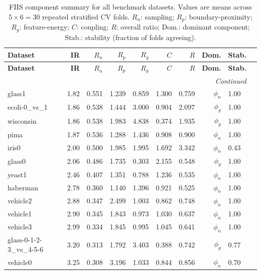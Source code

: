 \begin{longtable}{lrrrrrrrll}
\caption{FIIS component summary for all benchmark datasets. Values are means across $5\times6=30$ repeated stratified CV folds. $R_n$: sampling; $R_p$: boundary-proximity; $R_g$: feature-energy; $C$: coupling; $R$: overall ratio; Dom.: dominant component; Stab.: stability (fraction of folds agreeing).}
\label{tab:fiis_components} \\
\toprule
\textbf{Dataset} & \textbf{IR} & \textbf{$R_n$} & \textbf{$R_p$} & \textbf{$R_g$} & \textbf{$C$} & \textbf{$R$} & \textbf{Dom.} & \textbf{Stab.} \\
\midrule
\endfirsthead
\toprule
\textbf{Dataset} & \textbf{IR} & \textbf{$R_n$} & \textbf{$R_p$} & \textbf{$R_g$} & \textbf{$C$} & \textbf{$R$} & \textbf{Dom.} & \textbf{Stab.} \\
\midrule
\endhead
\midrule \multicolumn{9}{r}{\textit{Continued}} \\
\endfoot
\bottomrule
\endlastfoot
    glass1 & 1.82 & 0.551 & 1.239 & 0.859 & 1.300 & 0.759 & $\phi_{n}$ & 1.00 \\
    ecoli-0\_vs\_1 & 1.86 & 0.538 & 1.444 & 3.000 & 0.904 & 2.097 & $\phi_{g}$ & 1.00 \\
    wisconsin & 1.86 & 0.538 & 1.983 & 4.838 & 0.374 & 1.935 & $\phi_{g}$ & 1.00 \\
    pima & 1.87 & 0.536 & 1.288 & 1.436 & 0.908 & 0.900 & $\phi_{n}$ & 1.00 \\
    iris0 & 2.00 & 0.500 & 1.985 & 1.995 & 1.692 & 3.342 & $\phi_{n}$ & 0.43 \\
    glass0 & 2.06 & 0.486 & 1.735 & 0.303 & 2.155 & 0.548 & $\phi_{g}$ & 1.00 \\
    yeast1 & 2.46 & 0.407 & 1.351 & 0.788 & 1.236 & 0.535 & $\phi_{n}$ & 1.00 \\
    haberman & 2.78 & 0.360 & 1.140 & 1.396 & 0.921 & 0.525 & $\phi_{n}$ & 1.00 \\
    vehicle2 & 2.88 & 0.347 & 2.499 & 1.003 & 0.862 & 0.748 & $\phi_{n}$ & 1.00 \\
    vehicle1 & 2.90 & 0.345 & 1.843 & 0.973 & 1.030 & 0.637 & $\phi_{n}$ & 1.00 \\
    vehicle3 & 2.99 & 0.334 & 1.845 & 0.995 & 1.045 & 0.641 & $\phi_{n}$ & 1.00 \\
    glass-0-1-2-3\_vs\_4-5-6 & 3.20 & 0.313 & 1.792 & 3.403 & 0.388 & 0.742 & $\phi_{g}$ & 0.77 \\
    vehicle0 & 3.25 & 0.308 & 3.196 & 1.033 & 0.844 & 0.856 & $\phi_{n}$ & 0.70 \\

\end{longtable}

